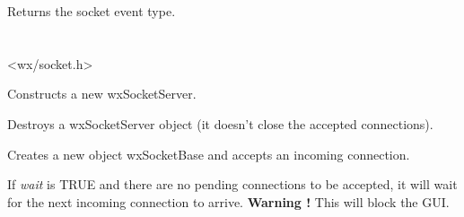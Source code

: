 
Returns the socket event type.

\section{}\label{wxsocketserver}




<wx/socket.h>


%
%
\label{wxsocketserverconstr}


Constructs a new wxSocketServer.




%
%


Destroys a wxSocketServer object (it doesn't close the accepted connections).

%
%
\label{wxsocketserveraccept}


Creates a new object wxSocketBase and accepts an incoming connection.

If {\it wait} is TRUE and there are no pending connections to be
accepted, it will wait for the next incoming connection to arrive.
{\bf Warning !} This will block the GUI.

